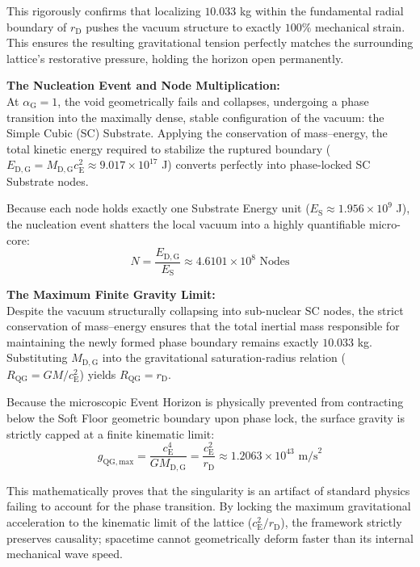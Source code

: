 This rigorously confirms that localizing $10.033$ kg within the fundamental radial boundary of $r_{\mathrm{D}}$ pushes the vacuum structure to exactly $100\%$ mechanical strain. This ensures the resulting gravitational tension perfectly matches the surrounding lattice's restorative pressure, holding the horizon open permanently.

\vspace{0.5em}
\noindent\textbf{The Nucleation Event and Node Multiplication:}\\
At $\alpha_{\mathrm{G}} = 1$, the void geometrically fails and collapses, undergoing a phase transition into the maximally dense, stable configuration of the vacuum: the Simple Cubic (SC) Substrate. Applying the conservation of mass--energy, the total kinetic energy required to stabilize the ruptured boundary ($E_{\mathrm{D,G}} = M_{\mathrm{D,G}} c_{\mathrm{E}}^2 \approx 9.017 \times 10^{17}$ J) converts perfectly into phase-locked SC Substrate nodes.

Because each node holds exactly one Substrate Energy unit ($E_{\mathrm{S}} \approx 1.956 \times 10^9$ J), the nucleation event shatters the local vacuum into a highly quantifiable micro-core:
\begin{equation}
    N = \frac{E_{\mathrm{D,G}}}{E_{\mathrm{S}}} \approx 4.6101 \times 10^8 \text{ Nodes}
\end{equation}

\vspace{0.5em}
\noindent\textbf{The Maximum Finite Gravity Limit:}\\
Despite the vacuum structurally collapsing into sub-nuclear SC nodes, the strict conservation of mass--energy ensures that the total inertial mass responsible for maintaining the newly formed phase boundary remains exactly $10.033$ kg. Substituting $M_{\mathrm{D,G}}$ into the gravitational saturation-radius relation ($R_{\mathrm{QG}} = GM/c_{\mathrm{E}}^2$) yields $R_{\mathrm{QG}} = r_{\mathrm{D}}$.

Because the microscopic Event Horizon is physically prevented from contracting below the Soft Floor geometric boundary upon phase lock, the surface gravity is strictly capped at a finite kinematic limit:
\begin{equation}
    g_{\mathrm{QG,max}} = \frac{c_{\mathrm{E}}^4}{G M_{\mathrm{D,G}}} = \frac{c_{\mathrm{E}}^2}{r_{\mathrm{D}}} \approx 1.2063 \times 10^{43} \text{ m/s}^2
\end{equation}

This mathematically proves that the singularity is an artifact of standard physics failing to account for the phase transition. By locking the maximum gravitational acceleration to the kinematic limit of the lattice ($c_{\mathrm{E}}^2/r_{\mathrm{D}}$), the framework strictly preserves causality; spacetime cannot geometrically deform faster than its internal mechanical wave speed.

